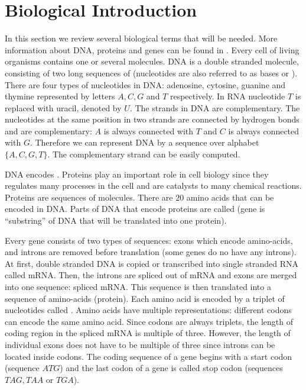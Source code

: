 \section{Biological Introduction}



In this section we review several biological terms that will be needed. More
information about DNA, proteins and genes can be found in
\cite{BiologyForDummies,UnderstandingBioinformatics}.  Every cell of living
organisms contains one or several  molecules. DNA is a double
stranded molecule, consisting of two long sequences of 
(nucleotides are also referred to as bases or ). There are
four types of nucleotides in DNA: adenosine, cytosine, guanine and thymine
represented by letters $A,C,G$ and $T$ respectively. In RNA nucleotide $T$ is
replaced with uracil, denoted by $U$. The strands in DNA are complementary. The
nucleotides at the same position in two strands are connected by hydrogen bonds
and are complementary: $A$ is always connected with $T$ and $C$ is always
connected with $G$. Therefore we can represent DNA by a sequence over alphabet
$\{A,C,G,T\}$. The complementary strand can be easily computed.

DNA encodes . Proteins play an important role in cell
biology since  they regulates many processes in the cell and are catalysts to
many chemical reactions. Proteins are sequences of 
molecules. There are $20$ amino acids that can be encoded in DNA. Parts of DNA
that encode proteins are called  (gene is ``substring'' of DNA
that will be translated into one protein).

Every gene consists of two types of sequences: exons which encode amino-acids,
and introns are removed before translation (some genes do no have any introns).
At first, double stranded DNA is copied or transcribed into single stranded RNA
called mRNA. Then, the introns are spliced out of mRNA and exons are merged into
one sequence: spliced mRNA. This sequence is then translated into a sequence of
amino-acids (protein). Each amino acid is encoded by a triplet of nucleotides
called . Amino acids have multiple representations: different
codons can encode the same amino acid. Since codons are always triplets, the
length of coding region in the  spliced mRNA is multiple of three. However, the
length of individual exons does not have to be multiple of three since introns
can be located inside codons.  The coding sequence of a gene begins with a start
codon (sequence $ATG$) and the last codon of a gene is called stop codon
(sequences $TAG,TAA$ or $TGA$).

